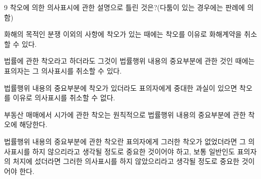 \begin{question}{9}
착오에 의한 의사표시에 관한 설명으로 틀린 것은?(다툼이 있는 경우에는 판례에 의함)
\begin{choices}
  \item 화해의 목적인 분쟁 이외의 사항에 착오가 있는 때에는 착오를 이유로 화해계약을 취소할 수 있다.
  \item 법률에 관한 착오라고 하더라도 그것이 법률행위 내용의 중요부분에 관한 것인 때에는 표의자는 그 의사표시를 취소할 수 있다.
  \item 법률행위 내용의 중요부분에 착오가 있더라도 표의자에게 중대한 과실이 있으면 착오를 이유로 의사표시를 취소할 수 없다.
  \item 부동산 매매에서 시가에 관한 착오는 원칙적으로 법률행위 내용의 중요부분에 관한 착오에 해당한다.
  \item 법률행위 내용의 중요부분에 관한 착오란 표의자에게 그러한 착오가 없었더라면 그 의사표시를 하지 않으리라고 생각될 정도로 중요한 것이어야 하고, 보통 일반인도 표의자의 처지에 섰더라면 그러한 의사표시를 하지 않았으리라고 생각될 정도로 중요한 것이어야 한다.
\end{choices}
\end{question}
